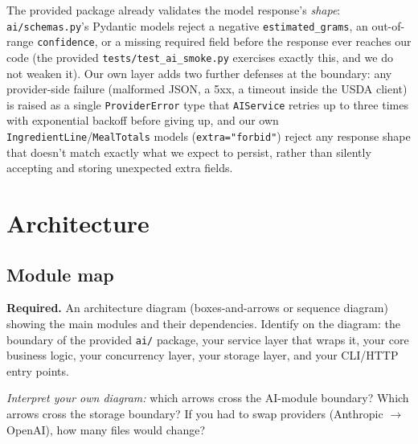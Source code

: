 \documentclass[11pt,a4paper]{article}
\newenvironment{deliverbox}{\begin{deliverboxshown}}{\end{deliverboxshown}}
\newenvironment{probebox}{\begin{probeboxshown}}{\end{probeboxshown}}
\newenvironment{deliverbox}{\setbox0\vbox\bgroup}{\egroup\ignorespacesafterend}
\newenvironment{probebox}{\setbox0\vbox\bgroup}{\egroup\ignorespacesafterend}
\begin{document}
\par\noindent
The provided package already validates the model response's \emph{shape}:
\texttt{ai/schemas.py}'s Pydantic models reject a negative
\texttt{estimated\_grams}, an out-of-range \texttt{confidence}, or a missing
required field before the response ever reaches our code (the provided
\texttt{tests/test\_ai\_smoke.py} exercises exactly this, and we do not
weaken it). Our own layer adds two further defenses at the boundary: any
provider-side failure (malformed JSON, a 5xx, a timeout inside the USDA
client) is raised as a single \texttt{ProviderError} type that
\texttt{AIService} retries up to three times with exponential backoff before
giving up, and our own \texttt{IngredientLine}/\texttt{MealTotals} models
(\texttt{extra="forbid"}) reject any response shape that doesn't match
exactly what we expect to persist, rather than silently accepting and
storing unexpected extra fields.

\section{Architecture}\label{sec:arch}

\subsection{Module map}

\begin{deliverbox}
\textbf{Required.} An architecture diagram (boxes-and-arrows or sequence diagram) showing the main modules and their dependencies. Identify on the diagram: the boundary of the provided \texttt{ai/} package, your service layer that wraps it, your core business logic, your concurrency layer, your storage layer, and your CLI/HTTP entry points.
\end{deliverbox}

\begin{probebox}
\textit{Interpret your own diagram:} which arrows cross the AI-module boundary? Which arrows cross the storage boundary? If you had to swap providers (Anthropic $\to$ OpenAI), how many files would change?
\end{probebox}
\end{document}
